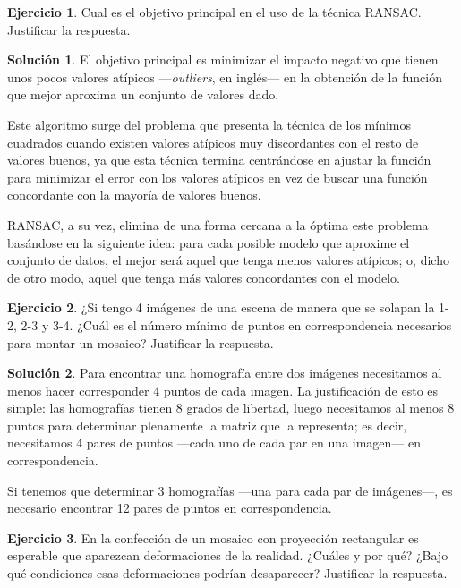 \documentclass[a4paper, 11pt]{article}
\theoremstyle{definition}
\newtheorem{ejercicio}{Ejercicio}
\newtheorem*{solucion}{Solución}
\theoremstyle{theorem}
\begin{document}
  \begin{ejercicio}
      Cual es el objetivo principal en el uso de la técnica RANSAC. Justificar la respuesta.
  \end{ejercicio}

  \begin{solucion}
      El objetivo principal es minimizar el impacto negativo que tienen unos pocos valores atípicos ---\emph{outliers}, en inglés--- en la obtención de la función que mejor aproxima un conjunto de valores dado.

      Este algoritmo surge del problema que presenta la técnica de los mínimos cuadrados cuando existen valores atípicos muy discordantes con el resto de valores buenos, ya que esta técnica termina centrándose en ajustar la función para minimizar el error con los valores atípicos en vez de buscar una función concordante con la mayoría de valores buenos.

      RANSAC, a su vez, elimina de una forma cercana a la óptima este problema basándose en la siguiente idea: para cada posible modelo que aproxime el conjunto de datos, el mejor será aquel que tenga menos valores atípicos; o, dicho de otro modo, aquel que tenga más valores concordantes con el modelo.
  \end{solucion}

  \begin{ejercicio}
      ¿Si tengo 4 imágenes de una escena de manera que se solapan la 1-2, 2-3 y 3-4. ¿Cuál es el número mínimo de puntos en correspondencia necesarios para montar un mosaico? Justificar la respuesta.
  \end{ejercicio}

  \begin{solucion}
      Para encontrar una homografía entre dos imágenes necesitamos al menos hacer corresponder 4 puntos de cada imagen. La justificación de esto es simple: las homografías tienen 8 grados de libertad, luego necesitamos al menos 8 puntos para determinar plenamente la matriz que la representa; es decir, necesitamos 4 pares de puntos ---cada uno de cada par en una imagen--- en correspondencia.

      Si tenemos que determinar 3 homografías ---una para cada par de imágenes---, es necesario encontrar 12 pares de puntos en correspondencia.
  \end{solucion}

  \begin{ejercicio}
      En la confección de un mosaico con proyección rectangular es esperable que aparezcan deformaciones de la realidad. ¿Cuáles y por qué? ¿Bajo qué condiciones esas deformaciones podrían desaparecer? Justificar la respuesta.
  \end{ejercicio}
\end{document}

